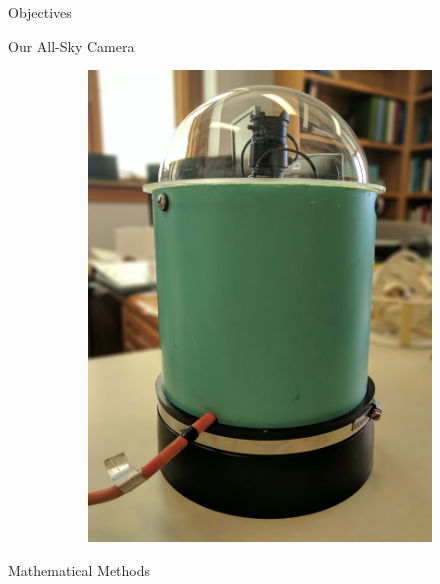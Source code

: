 \documentclass[final]{beamer}
\newlength{\twocolwid}
\begin{document}
\begin{frame}[t]
\begin{columns}[t]
\begin{column}{\twocolwid}
\begin{alertblock}{Objectives}
\end{alertblock}


\begin{alertblock}{Our All-Sky Camera}

\begin{figure}
\centering
\begin{subfigure}{.7\textwidth}
  \centering
  \includegraphics[width=\linewidth]{deesix.jpg}
  \label{fig:sub1}
\end{subfigure}%
\label{fig:test}
\end{figure}

\end{alertblock}
\begin{block}{Mathematical Methods}


\end{block}
\end{column}
\end{columns}
\end{frame}
\end{document}
